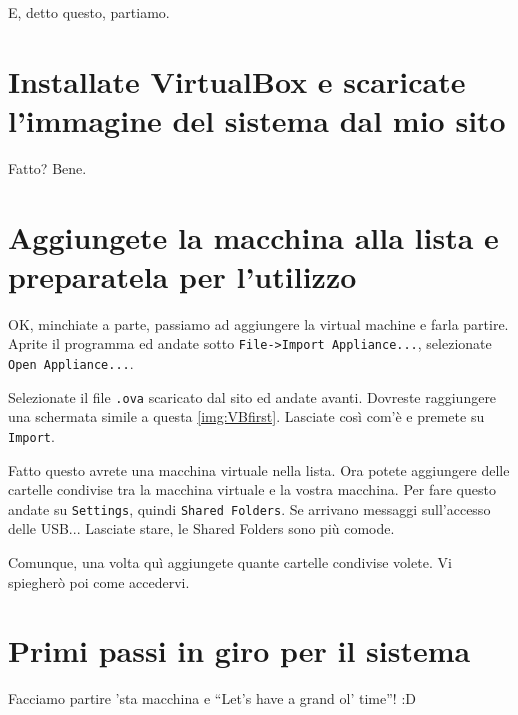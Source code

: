 \documentclass[a4paper]{memoir}
\begin{document}
	
	E, detto questo, partiamo.
	
	\section{Installate VirtualBox e scaricate l'immagine del sistema dal mio sito}
	
		Fatto? Bene.
		
	\section{Aggiungete la macchina alla lista e preparatela per l'utilizzo}
		
		OK, minchiate a parte, passiamo ad aggiungere la virtual machine e farla partire. Aprite il programma
		ed andate sotto \texttt{File->Import Appliance...}, selezionate \texttt{Open Appliance...}.
		
		Selezionate il file \texttt{.ova} scaricato dal sito ed andate avanti. Dovreste raggiungere
		una schermata simile a questa \ref{img:VBfirst}. Lasciate così com'è e premete su \texttt{Import}.
		
		
		Fatto questo avrete una macchina virtuale nella lista. Ora potete aggiungere delle cartelle condivise
		tra la macchina virtuale e la vostra macchina. Per fare questo andate su \texttt{Settings}, quindi
		\texttt{Shared Folders}. Se arrivano messaggi sull'accesso delle USB... Lasciate stare, le Shared
		Folders sono più comode.
		
		Comunque, una volta quì aggiungete quante cartelle condivise volete. Vi spiegherò poi come accedervi.
		
	\section{Primi passi in giro per il sistema}
	
		Facciamo partire 'sta macchina e ``Let's have a grand ol' time''! :D
	
\end{document}
